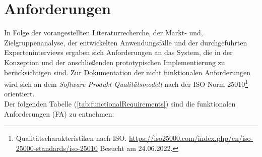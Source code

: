 \section{Anforderungen}
\label{sec:requirementsFinal}
    In Folge der vorangestellten Literaturrecherche, der Markt- und, Zielgruppenanalyse, der entwickelten Anwendungsfälle und 
    der durchgeführten Experteninterviews ergaben sich Anforderungen an das System, %
    die in der Konzeption und der anschließenden prototypischen Implementierung zu berücksichtigen sind. %
    Zur Dokumentation der nicht funktionalen Anforderungen wird sich an dem 
    \textit{Software Produkt Qualitätsmodell} nach der ISO Norm 25010\footnote{Qualitätscharakteristiken nach ISO. \url{https://iso25000.com/index.php/en/iso-25000-standards/iso-25010} Besucht am 24.06.2022.} 
    orientiert. 
    \\
    Der folgenden Tabelle (\ref{tab:functionalRequirements}) sind die funktionalen Anforderungen (FA) zu entnehmen: 

